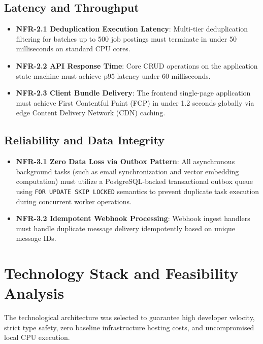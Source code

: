 \subsection{Latency and Throughput}
\begin{itemize}
    \item \textbf{NFR-2.1 Deduplication Execution Latency}: Multi-tier deduplication filtering for batches up to 500 job postings must terminate in under 50 milliseconds on standard CPU cores.
    \item \textbf{NFR-2.2 API Response Time}: Core CRUD operations on the application state machine must achieve p95 latency under 60 milliseconds.
    \item \textbf{NFR-2.3 Client Bundle Delivery}: The frontend single-page application must achieve First Contentful Paint (FCP) in under 1.2 seconds globally via edge Content Delivery Network (CDN) caching.
\end{itemize}

\subsection{Reliability and Data Integrity}
\begin{itemize}
    \item \textbf{NFR-3.1 Zero Data Loss via Outbox Pattern}: All asynchronous background tasks (such as email synchronization and vector embedding computation) must utilize a PostgreSQL-backed transactional outbox queue using \texttt{FOR UPDATE SKIP LOCKED} semantics to prevent duplicate task execution during concurrent worker operations.
    \item \textbf{NFR-3.2 Idempotent Webhook Processing}: Webhook ingest handlers must handle duplicate message delivery idempotently based on unique message IDs.
\end{itemize}

\section{Technology Stack and Feasibility Analysis}
The technological architecture was selected to guarantee high developer velocity, strict type safety, zero baseline infrastructure hosting costs, and uncompromised local CPU execution.

